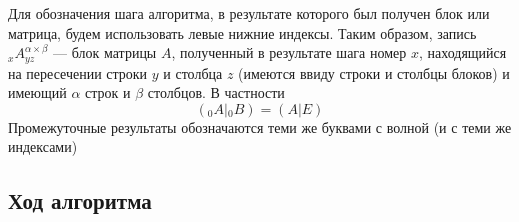 \documentclass[12pt, russian]{article}
\begin{document}
Для обозначения шага алгоритма, в результате которого был получен блок или матрица, будем использовать левые нижние индексы. Таким образом, запись ${}_x A_{yz}^{\alpha\times\beta}$ --- блок матрицы $A$, полученный в результате шага номер $x$, находящийся на пересечении строки $y$ и столбца $z$ (имеются ввиду строки и столбцы блоков) и имеющий $\alpha$ строк и $\beta$ столбцов. В частности
$$ ({}_0 A|{}_0 B) = (A|E) $$
Промежуточные результаты обозначаются теми же буквами с волной (и с теми же индексами)

\pagebreak
\subsection{Ход алгоритма}
\end{document}
